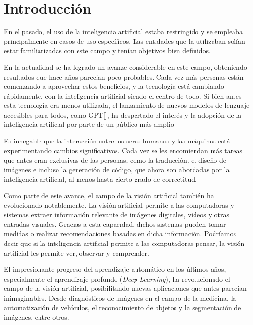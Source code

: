 \chapter*{Introducci\'on}\label{chapter:introduction}

En el pasado, el uso de la inteligencia artificial estaba restringido y se empleaba principalmente en casos de uso espec\'ificos. Las entidades que la utilizaban sol\'ian estar familiarizadas con este campo y ten\'ian objetivos bien definidos.

En la actualidad se ha logrado un avanze considerable en este campo, obteniendo resultados que hace a\~nos parec\'ian poco probables. Cada vez m\'as personas est\'an comenzando a aprovechar estos beneficios, y la tecnolog\'ia est\'a cambiando r\'apidamente, con la inteligencia artificial siendo el centro de todo. Si bien antes esta tecnolog\'ia era menos utilizada,  el lanzamiento de nuevos modelos de lenguaje accesibles para todos, como GPT[\cite{gpt2}], ha despertado el inter\'es y la adopci\'on de la inteligencia artificial por parte de un p\'ublico m\'as amplio.

Es innegable que la interacci\'on entre los seres humanos y las m\'aquinas est\'a experimentando cambios significativos. Cada vez se les encomiendan m\'as tareas que antes eran exclusivas de las personas, como la traducci\'on, el dise\~no de im\'agenes e incluso la generaci\'on de c\'odigo, que ahora son abordadas por la inteligencia artificial, al menos hasta cierto grado de correctitud.

Como parte de este avance, el campo de la visi\'on artificial tambi\'en ha evolucionado notablemente. La visi\'on artificial permite a las computadoras y sistemas extraer informaci\'on relevante de im\'agenes digitales, videos y otras entradas visuales. Gracias a esta capacidad, dichos sistemas pueden tomar medidas o realizar recomendaciones basadas en dicha informaci\'on. Podr\'iamos decir que si la inteligencia artificial permite a las computadoras pensar, la visi\'on artificial les permite ver, observar y comprender.

El impresionante progreso del aprendizaje autom\'atico en los \'ultimos a\~nos, especialmente el aprendizaje profundo (\textit{Deep Learning}), ha revolucionado el campo de la visi\'on artificial, posibilitando nuevas aplicaciones que antes parec\'ian inimaginables. Desde diagn\'osticos de im\'agenes en el campo de la medicina, la automatizaci\'on de veh\'iculos, el reconocimiento de objetos y la segmentaci\'on de im\'agenes, entre otros.

